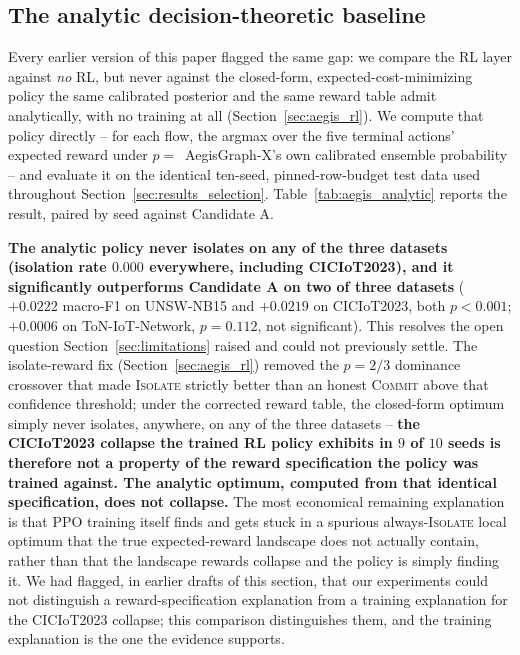 \documentclass[journal]{IEEEtran}
\begin{document}
\subsection{The analytic decision-theoretic baseline}
\label{sec:results_analytic}

Every earlier version of this paper flagged the same gap: we compare the RL
layer against \emph{no} RL, but never against the closed-form,
expected-cost-minimizing policy the same calibrated posterior and the same
reward table admit analytically, with no training at all
(Section~\ref{sec:aegis_rl}). We compute that policy directly -- for each
flow, the argmax over the five terminal actions' expected reward under
$p=$~AegisGraph-X's own calibrated ensemble probability -- and evaluate it
on the identical ten-seed, pinned-row-budget test data used throughout
Section~\ref{sec:results_selection}. Table~\ref{tab:aegis_analytic} reports
the result, paired by seed against Candidate A.

\textbf{The analytic policy never isolates on any of the three datasets
(isolation rate $0.000$ everywhere, including CICIoT2023), and it
significantly outperforms Candidate A on two of three datasets} ($+0.0222$
macro-F1 on UNSW-NB15 and $+0.0219$ on CICIoT2023, both $p<0.001$; $+0.0006$
on ToN-IoT-Network, $p=0.112$, not significant). This resolves the open
question Section~\ref{sec:limitations} raised and could not previously
settle. The isolate-reward fix (Section~\ref{sec:aegis_rl}) removed the
$p=2/3$ dominance crossover that made \textsc{Isolate} strictly better than
an honest \textsc{Commit} above that confidence threshold; under the
corrected reward table, the closed-form optimum simply never isolates,
anywhere, on any of the three datasets -- \textbf{the CICIoT2023 collapse
the trained RL policy exhibits in $9$ of $10$ seeds is therefore not a
property of the reward specification the policy was trained against. The
analytic optimum, computed from that identical specification, does not
collapse.} The most economical remaining explanation is that PPO training
itself finds and gets stuck in a spurious always-\textsc{Isolate} local
optimum that the true expected-reward landscape does not actually contain,
rather than that the landscape rewards collapse and the policy is simply
finding it. We had flagged, in earlier drafts of this section, that our
experiments could not distinguish a reward-specification explanation from a
training explanation for the CICIoT2023 collapse; this comparison
distinguishes them, and the training explanation is the one the evidence
supports.
\end{document}
